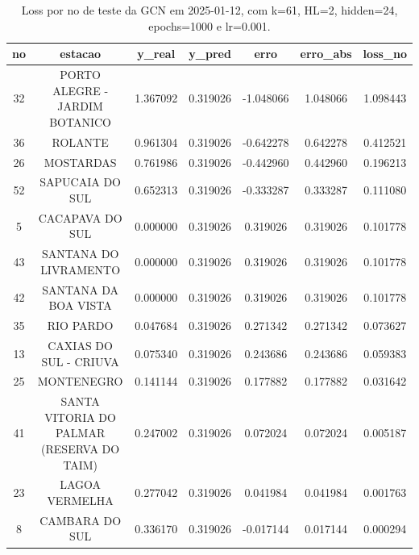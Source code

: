 \begin{table}[h]
\centering
\caption{Loss por no de teste da GCN em 2025-01-12, com k=61, HL=2, hidden=24, epochs=1000 e lr=0.001.}
\label{tab:gcn_loss_k61_hl2_h24_e1000_d20250112}
\begin{tabular}{ccccccc}
\toprule
no & estacao & y\_real & y\_pred & erro & erro\_abs & loss\_no \\
\midrule
32 & PORTO ALEGRE - JARDIM BOTANICO & 1.367092 & 0.319026 & -1.048066 & 1.048066 & 1.098443 \\
36 & ROLANTE & 0.961304 & 0.319026 & -0.642278 & 0.642278 & 0.412521 \\
26 & MOSTARDAS & 0.761986 & 0.319026 & -0.442960 & 0.442960 & 0.196213 \\
52 & SAPUCAIA DO SUL & 0.652313 & 0.319026 & -0.333287 & 0.333287 & 0.111080 \\
5 & CACAPAVA DO SUL & 0.000000 & 0.319026 & 0.319026 & 0.319026 & 0.101778 \\
43 & SANTANA DO LIVRAMENTO & 0.000000 & 0.319026 & 0.319026 & 0.319026 & 0.101778 \\
42 & SANTANA DA BOA VISTA & 0.000000 & 0.319026 & 0.319026 & 0.319026 & 0.101778 \\
35 & RIO PARDO & 0.047684 & 0.319026 & 0.271342 & 0.271342 & 0.073627 \\
13 & CAXIAS DO SUL - CRIUVA & 0.075340 & 0.319026 & 0.243686 & 0.243686 & 0.059383 \\
25 & MONTENEGRO & 0.141144 & 0.319026 & 0.177882 & 0.177882 & 0.031642 \\
41 & SANTA VITORIA DO PALMAR (RESERVA DO TAIM) & 0.247002 & 0.319026 & 0.072024 & 0.072024 & 0.005187 \\
23 & LAGOA VERMELHA & 0.277042 & 0.319026 & 0.041984 & 0.041984 & 0.001763 \\
8 & CAMBARA DO SUL & 0.336170 & 0.319026 & -0.017144 & 0.017144 & 0.000294 \\
\bottomrule
\end{tabular}
\end{table}
